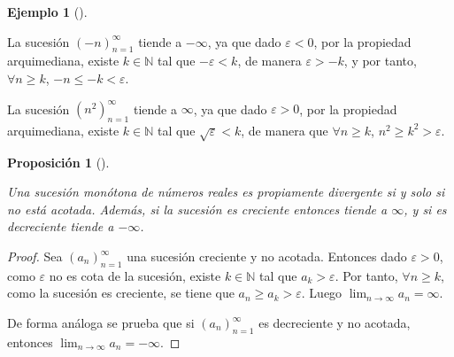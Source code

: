 \documentclass[
  a4paper,
]{scrreport}
\theoremstyle{definition}
\newtheorem{example}{Ejemplo}[chapter]
\theoremstyle{plain}
\theoremstyle{definition}
\theoremstyle{definition}
\theoremstyle{plain}
\theoremstyle{plain}
\newtheorem{proposition}{Proposición}[chapter]
\theoremstyle{remark}
\begin{document}
\begin{example}[]\protect\hypertarget{exm-sucesiones-propiamente-divergentes}{}\label{exm-sucesiones-propiamente-divergentes}

La sucesión \((-n)_{n=1}^\infty\) tiende a \(-\infty\), ya que dado
\(\varepsilon<0\), por la propiedad arquimediana, existe
\(k\in\mathbb{N}\) tal que \(-\varepsilon<k\), de manera
\(\varepsilon>-k\), y por tanto, \(\forall n\geq k\),
\(-n\leq -k < \varepsilon\).

La sucesión \((n^2)_{n=1}^\infty\) tiende a \(\infty\), ya que dado
\(\varepsilon>0\), por la propiedad arquimediana, existe
\(k\in\mathbb{N}\) tal que \(\sqrt{\varepsilon}<k\), de manera que
\(\forall n\geq k\), \(n^2\geq k^2>\varepsilon\).

\end{example}

\begin{proposition}[]\protect\hypertarget{prp-sucesiones-propiamentes-divergentes-no-acotadas}{}\label{prp-sucesiones-propiamentes-divergentes-no-acotadas}

Una sucesión monótona de números reales es propiamente divergente si y
solo si no está acotada. Además, si la sucesión es creciente entonces
tiende a \(\infty\), y si es decreciente tiende a \(-\infty\).

\end{proposition}

\begin{tcolorbox}[enhanced jigsaw, leftrule=.75mm, colbacktitle=quarto-callout-note-color!10!white, toprule=.15mm, opacityback=0, opacitybacktitle=0.6, toptitle=1mm, breakable, bottomtitle=1mm, colframe=quarto-callout-note-color-frame, rightrule=.15mm, titlerule=0mm, title=\textcolor{quarto-callout-note-color}{\faInfo}\hspace{0.5em}{Demostración}, arc=.35mm, left=2mm, bottomrule=.15mm, colback=white, coltitle=black]

\begin{proof}
Sea \((a_n)_{n=1}^\infty\) una sucesión creciente y no acotada. Entonces
dado \(\varepsilon>0\), como \(\varepsilon\) no es cota de la sucesión,
existe \(k\in\mathbb{N}\) tal que \(a_k>\varepsilon\). Por tanto,
\(\forall n\geq k\), como la sucesión es creciente, se tiene que
\(a_n\geq a_k>\varepsilon\). Luego \(\lim_{n\to\infty}a_n=\infty\).

De forma análoga se prueba que si \((a_n)_{n=1}^\infty\) es decreciente
y no acotada, entonces \(\lim_{n\to\infty}a_n=-\infty\).
\end{proof}

\end{tcolorbox}
\end{document}
